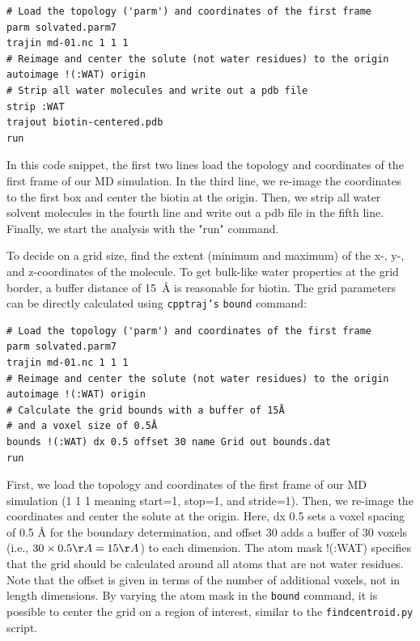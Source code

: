 \documentclass[9pt,tutorial,pubversion]{livecoms}
\newcommand{\software}{\texttt}
\newcommand\inlinecode{\texttt}
\begin{document}
\begin{lstlisting}[style=cpptraj]
# Load the topology ('parm') and coordinates of the first frame
parm solvated.parm7 
trajin md-01.nc 1 1 1 
# Reimage and center the solute (not water residues) to the origin
autoimage !(:WAT) origin 
# Strip all water molecules and write out a pdb file
strip :WAT 
trajout biotin-centered.pdb 
run
\end{lstlisting}
In this code snippet, the first two lines load the topology and coordinates of the first frame of our MD simulation.
In the third line, we re-image the coordinates to the first box and center the biotin at the origin. 
Then, we strip all water solvent molecules in the fourth line and write out a pdb file in the fifth line. 
Finally, we start the analysis with the "run" command.

To decide on a grid size, find the extent (minimum and maximum) of the x-, \mbox{y-,} and z-coordinates of the molecule.
To get bulk-like water properties at the grid border, a buffer distance of \qty{15}{\angstrom} is reasonable for biotin.
The grid parameters can be directly calculated using \software{cpptraj's} \inlinecode{bound} command:
\begin{lstlisting}[style=cpptraj]
# Load the topology ('parm') and coordinates of the first frame
parm solvated.parm7
trajin md-01.nc 1 1 1
# Reimage and center the solute (not water residues) to the origin
autoimage !(:WAT) origin
# Calculate the grid bounds with a buffer of 15Å
# and a voxel size of 0.5Å
bounds !(:WAT) dx 0.5 offset 30 name Grid out bounds.dat
run
\end{lstlisting}
First, we load the topology and coordinates of the first frame of our MD simulation (1 1 1 meaning start=1, stop=1, and stride=1).
Then, we re-image the coordinates and center the solute at the origin.
Here, dx 0.5 sets a voxel spacing of 0.5 Å for the boundary determination, and offset 30 adds a buffer of 30 voxels (i.e., $30 \times 0.5 \AA = 15 \AA$) to each dimension.
The atom mask !(:WAT) specifies that the grid should be calculated around all atoms that are not water residues.
Note that the offset is given in terms of the number of additional voxels, not in length dimensions. 
By varying the atom mask in the \inlinecode{bound} command, it is possible to center the grid on a region of interest, similar to the \software{findcentroid.py} script.
\end{document}
